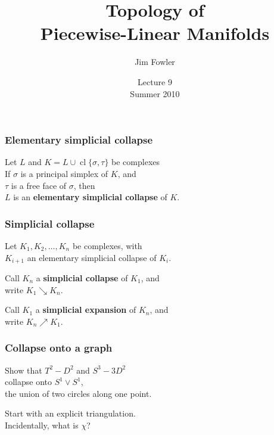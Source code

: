 \documentclass[14pt]{beamer}
\title{Topology of  \\ Piecewise-Linear Manifolds}
\author{Jim Fowler}
\date{Lecture 9 \\ Summer 2010}
\newcommand{\collapses}{\searrow}
\newcommand{\expands}{\nearrow}
\DeclareMathOperator{\cl}{cl}
\newcommand{\setbackgroundpicture}[1]{%
\usebackgroundtemplate{
\begin{pgfpicture}{0in}{0in}{\paperwidth}{\paperheight}
\pgfputat{\pgfxy(0,0)}{\texttt{[image: \#1]}}
\color{white}
\pgfsetfillopacity{0.8}
\pgfrect[fill]{\pgfxy(0,0)}{\pgfpoint{\paperwidth}{\paperheight}}
\end{pgfpicture}
}
}
\newcommand{\clearbackgroundpicture}{\usebackgroundtemplate{}}
\begin{document}
\begin{frame}
\maketitle
\end{frame}

\begin{frame}
\frametitle{Elementary simplicial collapse}

\begin{definition}
  Let $L$ and $K = L \cup \cl \{ \sigma, \tau \}$ be complexes \\

  \vspace{1ex}If $\sigma$ is a principal simplex of $K$, and \\
  $\tau$ is a free face of $\sigma$, then \\
  $L$ is an \textbf{elementary simplicial collapse} of $K$.
\end{definition}

\end{frame}

\begin{frame}
\frametitle{Simplicial collapse}

\begin{definition}
  Let $K_1, K_2, \ldots, K_n$ be complexes, with \\
  $K_{i+1}$ an elementary simplicial collapse of $K_i$.

  \vspace{1ex}Call $K_n$ a \textbf{simplicial collapse} of $K_1$, and \\
  write $K_1 \collapses K_n$.

  \vspace{1ex}Call $K_1$ a \textbf{simplicial expansion} of $K_n$, and \\
  write $K_n \expands K_1$.
\end{definition}

\end{frame}

\setbackgroundpicture{problem07.pdf}
\begin{frame}
  \frametitle{Collapse onto a graph}

  \begin{problem}
    Show that $T^2 - D^2$ and $S^3 - 3D^2$ \\
    collapse onto $S^1 \vee S^1$, \\
    the union of two circles along one point.
\end{problem}
  \pause
  Start with an explicit triangulation. \\\pause
  Incidentally, what is $\chi$?
\end{frame}
\clearbackgroundpicture
\end{document}
